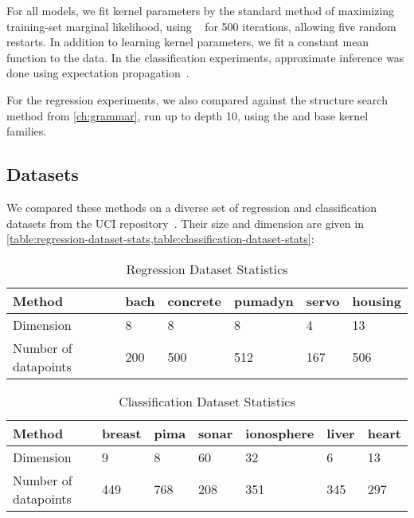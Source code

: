 For all \gp{} models, we fit kernel parameters by the standard method of maximizing training-set marginal likelihood, using \LBFGS{}~\citep{nocedal1980updating} for 500 iterations, allowing five random restarts.
In addition to learning kernel parameters, we fit a constant mean function to the data.
In the classification experiments, approximate \gp{} inference was done using expectation propagation~\citep{minka2001expectation}.

For the regression experiments, we also compared against the structure search method from \cref{ch:grammar}, run up to depth 10, using the \SE{} and \RQ{} base kernel families.

\subsection{Datasets}

We compared these methods on a diverse set of regression and classification datasets from the UCI repository~\citep{UCI}.
Their size and dimension are given in \cref{table:regression-dataset-stats,table:classification-dataset-stats}:

\begin{table}[h]
\caption{Regression Dataset Statistics}
\label{tbl:Regression Dataset Statistics}
\begin{center}
\begin{tabular}{l | lllll}
Method & bach & concrete & pumadyn & servo & housing \\ \hline
Dimension      & 8    & 8        & 8       & 4     & 13 \\
Number of datapoints       & 200  & 500      & 512     & 167   & 506
\end{tabular}
\end{center}
\label{table:regression-dataset-stats}
\end{table}
%
\begin{table}[h]
\caption{Classification Dataset Statistics}
\label{tbl:Classification Dataset Statistics}
\begin{center}
\begin{tabular}{l | llllll}
Method & breast & pima & sonar & ionosphere & liver & heart\\ \hline
Dimension      & 9      & 8    & 60    & 32         & 6     & 13 \\
Number of datapoints      & 449    & 768  & 208   & 351        & 345   & 297
\end{tabular}
\end{center}
\label{table:classification-dataset-stats}
\end{table}

